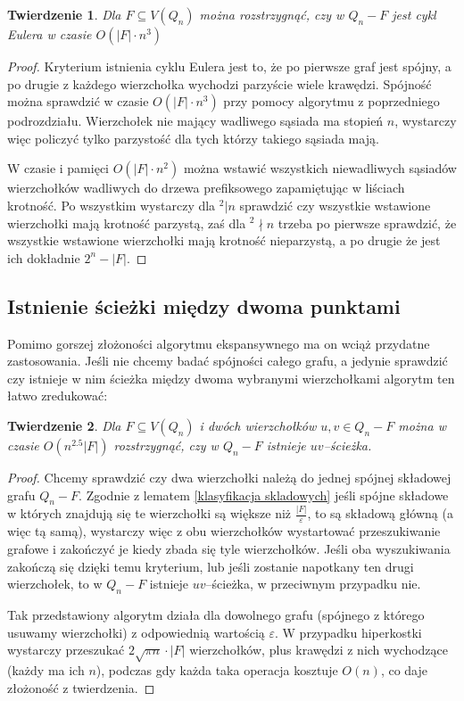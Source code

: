 \documentclass{pracamgr}
\newtheorem{theorem}{Twierdzenie}[chapter]
\begin{document}
    \begin{theorem}\label{cykl Eulera}
     Dla $F\subseteq V(Q_n)$ można rozstrzygnąć, czy w $Q_n-F$ jest cykl Eulera w czasie $O(|F|\cdot n^3)$
    \end{theorem}
    \begin{proof}
     Kryterium istnienia cyklu Eulera jest to, że po pierwsze graf jest spójny, a po drugie z każdego wierzchołka wychodzi parzyście wiele krawędzi.
     Spójność można sprawdzić w czasie $O(|F|\cdot n^3)$ przy pomocy algorytmu z poprzedniego podrozdziału.
     Wierzchołek nie mający wadliwego sąsiada ma stopień $n$, wystarczy więc policzyć tylko parzystość dla tych którzy takiego sąsiada mają.
     
     W czasie i pamięci $O(|F|\cdot n^2)$ można wstawić wszystkich niewadliwych sąsiadów wierzchołków wadliwych
     do drzewa prefiksowego zapamiętując w liściach krotność.
     Po wszystkim wystarczy dla $^2|n$ sprawdzić czy wszystkie wstawione wierzchołki mają krotność parzystą, zaś dla $^2\nmid n$ trzeba po pierwsze sprawdzić,
     że wszystkie wstawione wierzchołki mają krotność nieparzystą, a po drugie że jest ich dokładnie $2^n-|F|$.
    \end{proof}
   \subsection{Istnienie ścieżki między dwoma punktami}
    Pomimo gorszej złożoności algorytmu ekspansywnego ma on wciąż przydatne zastosowania. Jeśli nie chcemy badać spójności całego grafu, a jedynie sprawdzić
    czy istnieje w nim ścieżka między dwoma wybranymi wierzchołkami algorytm ten łatwo zredukować:
    \begin{theorem}
     Dla $F\subseteq V(Q_n)$ i dwóch wierzchołków $u,v\in Q_n-F$ można w czasie $O(n^{2.5}|F|)$ rozstrzygnąć, czy w $Q_n-F$ istnieje $uv$--ścieżka.
    \end{theorem}
    \begin{proof}
     Chcemy sprawdzić czy dwa wierzchołki należą do jednej spójnej składowej grafu $Q_n-F$. Zgodnie z lematem \ref{klasyfikacja skladowych}
     jeśli spójne składowe w których znajdują się te wierzchołki są większe niż $\frac{|F|}{\varepsilon}$, to są składową główną (a więc tą samą),
     wystarczy więc z obu wierzchołków wystartować przeszukiwanie grafowe i zakończyć je kiedy zbada się tyle wierzchołków.
     Jeśli oba wyszukiwania zakończą się dzięki temu kryterium, lub jeśli zostanie napotkany ten drugi wierzchołek, to w $Q_n-F$ istnieje $uv$--ścieżka,
     w przeciwnym przypadku nie.
     
     Tak przedstawiony algorytm działa dla dowolnego grafu (spójnego z którego usuwamy wierzchołki)
     z odpowiednią wartością $\varepsilon$. W przypadku hiperkostki wystarczy przeszukać $2\sqrt{\pi n}\cdot|F|$ wierzchołków,
     plus krawędzi z nich wychodzące (każdy ma ich $n$),
     podczas gdy każda taka operacja kosztuje $O(n)$, co daje złożoność z twierdzenia.
    \end{proof}    
\end{document}
